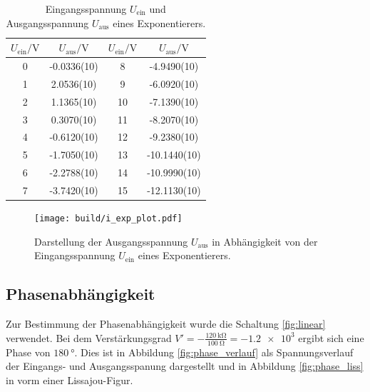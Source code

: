 \begin{table}[!h]
    \centering
    \caption{Eingangsspannung $U_\text{ein}$ und Ausgangsspannung $U_\text{aus}$ eines Exponentierers.}
    \label{tab:i_exp}
    \begin{tabular}{S[table-format=1.0] S[table-format=1.4(2)] S[table-format=2.0] S[table-format=2.4(2)]}
    \toprule 
        {$U_\text{ein}/\si{\volt}$} & {$U_\text{aus}/\si{\volt}$} & {$U_\text{ein}/\si{\volt}$} & {$U_\text{aus}/\si{\volt}$} \\
      &  -0.0336(10) & 8  &  -4.9490(10) \\
        1  &   2.0536(10) & 9  &  -6.0920(10) \\
        2  &   1.1365(10) & 10 &  -7.1390(10) \\
        3  &   0.3070(10) & 11 &  -8.2070(10) \\
        4  &  -0.6120(10) & 12 &  -9.2380(10) \\
        5  &  -1.7050(10) & 13 & -10.1440(10) \\
        6  &  -2.2788(10) & 14 & -10.9990(10) \\
        7  &  -3.7420(10) & 15 & -12.1130(10) \\
    \bottomrule
    \end{tabular}
\end{table}

\begin{figure}[!h]
    \centering
    \texttt{[image: build/i\_exp\_plot.pdf]}
    \caption{Darstellung der Ausgangsspannung $U_\text{aus}$ in Abhängigkeit von der Eingangsspannung $U_\text{ein}$ eines Exponentierers.}
    \label{fig:i_log}
\end{figure}

\subsection{Phasenabhängigkeit} %
\label{sub:phasenabhaengigkeit}

Zur Bestimmung der Phasenabhängigkeit wurde die Schaltung \ref{fig:linear} verwendet.
Bei dem Verstärkungsgrad $V' = -\frac{\SI{120}{\kilo\ohm}}{\SI{100}{\ohm}} = -\num{1.2e3}$ ergibt sich eine Phase von $\SI{180}{\degree}$.
Dies ist in Abbildung \ref{fig:phase_verlauf} als Spannungsverlauf der Eingangs- und Ausgangsspanung dargestellt und in Abbildung \ref{fig:phase_liss} in vorm einer Lissajou-Figur.

